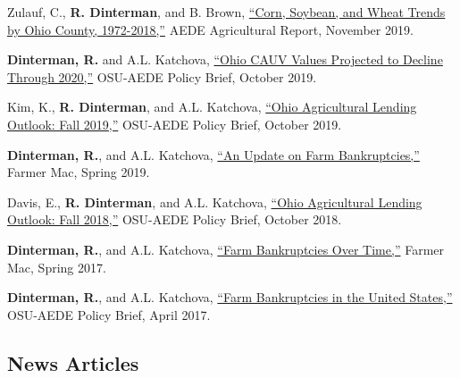 \documentclass[letterpaper]{article}
\renewenvironment{itemize}{
  \begin{list}{}{
    \setlength{\leftmargin}{1.5em}
  }
}{
  \end{list}
}
\begin{document}
\begin{itemize}
\item Zulauf, C., \textbf{R. Dinterman}, and B. Brown, \href{https://cpb-us-w2.wpmucdn.com/u.osu.edu/dist/9/29991/files/2019/11/Ohio-yield-trends-1972-2018.pdf}{``Corn, Soybean, and Wheat Trends by Ohio County, 1972-2018,''} AEDE Agricultural Report, November 2019.
\item \textbf{Dinterman, R.} and A.L. Katchova, \href{https://aede.osu.edu/sites/aede/files/publication_files/CAUVProjectionsFall2019.pdf}{``Ohio CAUV Values Projected to Decline Through 2020,''} OSU-AEDE Policy Brief, October 2019.
\item Kim, K., \textbf{R. Dinterman}, and A.L. Katchova, \href{https://aede.osu.edu/sites/aede/files/publication_files/AgLendingOutlook2019.pdf}{``Ohio Agricultural Lending Outlook: Fall 2019,''} OSU-AEDE Policy Brief, October 2019.

\item \textbf{Dinterman, R.}, and A.L. Katchova, \href{https://www.farmermac.com/wp-content/uploads/The-Feed-Spring-2019.pdf}{``An Update on Farm Bankruptcies,''} Farmer Mac, Spring 2019.
\item Davis, E., \textbf{R. Dinterman}, and A.L. Katchova, \href{https://aede.osu.edu/sites/aede/files/publication_files/AgLendingOutlook2018.pdf}{``Ohio Agricultural Lending Outlook: Fall 2018,''} OSU-AEDE Policy Brief, October 2018.
\item \textbf{Dinterman, R.}, and A.L. Katchova, \href{https://www.farmermac.com/wp-content/uploads/The-Feed-Spring-2017.pdf}{``Farm Bankruptcies Over Time,''} Farmer Mac, Spring 2017.
\item \textbf{Dinterman, R.}, and A.L. Katchova, \href{https://aede.osu.edu/sites/aede/files/publication_files/Farm%20Bankruptcies%20-%20Policy%20Brief.pdf}{``Farm Bankruptcies in the United States,''} OSU-AEDE Policy Brief, April 2017.
\end{itemize}

\subsection*{News Articles}
\end{document}
